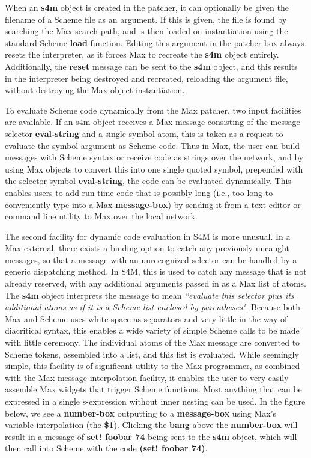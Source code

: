 \documentclass[acmsmall]{acmart}
\begin{document}
When an \textbf{s4m} object is created in the patcher, it can optionally be given
the filename of a Scheme file as an argument. If this is given, the
file is found by searching the Max search path, and is then loaded on 
instantiation using the standard Scheme \textbf{load} function.
Editing this argument in the patcher box always resets the
interpreter, as it forces Max to recreate the \textbf{s4m} object entirely. Additionally,
the \textbf{reset} message can be sent to the \textbf{s4m} object, and this results in 
the interpreter being destroyed and recreated, reloading the argument file,
without destroying the Max object instantiation.

To evaluate Scheme code dynamically from the Max patcher, two input facilities
are available. If an s4m object receives a Max message consisting of the 
message selector \textbf{eval-string} and a single symbol atom, 
this is taken as a request to evaluate the symbol argument as Scheme code. 
Thus in Max, the user can build messages
with Scheme syntax or receive code as strings over the network, and by
using Max objects to convert this into one single quoted symbol, prepended
with the selector symbol \textbf{eval-string}, the code can be evaluated dynamically.
This enables users to add run-time code that is possibly long 
(i.e., too long to conveniently type into a Max \textbf{message-box}) by
sending it from a text editor or command line utility to Max over the 
local network. 

The second facility for dynamic code evaluation in S4M is more unusual.
In a Max external, there exists a binding option to catch any previously
uncaught messages, so that a message with an unrecognized selector 
can be handled by a generic dispatching method. In S4M, this is used to 
catch any message that is not already reserved, with any additional 
arguments passed in as a Max list of atoms.  The \textbf{s4m} object interprets
the message to mean \textit{``evaluate this selector plus its additional atoms 
as if it is a Scheme list enclosed by parentheses"}.
Because both Max and Scheme uses white-space as separators and very little
in the way of diacritical syntax, this enables a wide variety
of simple Scheme calls to be made with little ceremony. The
individual atoms of the Max message are converted to Scheme tokens,
assembled into a list, and this list is evaluated. While seemingly simple,
this facility is of significant utility to the Max programmer, as combined
with the Max message interpolation facility, it enables the user to very
easily assemble Max widgets that trigger Scheme functions. Most anything that
can be expressed in a single s-expression without inner nesting can be used.
In the figure below,
we see a \textbf{number-box} outputting to a \textbf{message-box} using Max's 
variable interpolation (the \textbf{\$1}). 
Clicking the \textbf{bang} above the \textbf{number-box} will result in a message of 
\textbf{set! foobar 74} being sent to the \textbf{s4m} object, which will then call
into Scheme with the code \textbf{(set! foobar 74)}.
\end{document}
